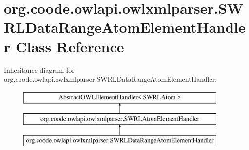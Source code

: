 \hypertarget{classorg_1_1coode_1_1owlapi_1_1owlxmlparser_1_1_s_w_r_l_data_range_atom_element_handler}{\section{org.\-coode.\-owlapi.\-owlxmlparser.\-S\-W\-R\-L\-Data\-Range\-Atom\-Element\-Handler Class Reference}
\label{classorg_1_1coode_1_1owlapi_1_1owlxmlparser_1_1_s_w_r_l_data_range_atom_element_handler}
}
Inheritance diagram for org.\-coode.\-owlapi.\-owlxmlparser.\-S\-W\-R\-L\-Data\-Range\-Atom\-Element\-Handler\-:\begin{figure}[H]
\begin{center}
\leavevmode
\includegraphics[height=3.000000cm]{classorg_1_1coode_1_1owlapi_1_1owlxmlparser_1_1_s_w_r_l_data_range_atom_element_handler}
\end{center}
\end{figure}
